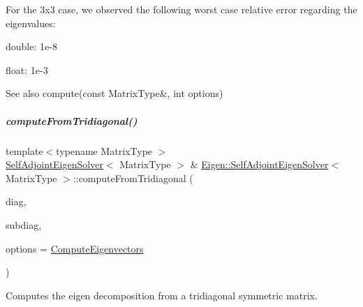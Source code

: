 For the 3x3 case, we observed the following worst case relative error regarding the eigenvalues\+:
\begin{DoxyItemize}
\item double\+: 1e-\/8
\item float\+: 1e-\/3
\end{DoxyItemize}

\begin{DoxySeeAlso}{See also}
compute(const Matrix\+Type\&, int options) 
\end{DoxySeeAlso}
\mbox{\label{group___eigenvalues___module_a297893df7098c43278d385e4d4e23fe4}} 
\subparagraph{\texorpdfstring{compute\+From\+Tridiagonal()}{computeFromTridiagonal()}\hspace{0.1cm}{\footnotesize\ttfamily [1/2]}}
{\footnotesize\ttfamily template$<$typename Matrix\+Type $>$ \\
\hyperlink{group___eigenvalues___module_class_eigen_1_1_self_adjoint_eigen_solver}{Self\+Adjoint\+Eigen\+Solver}$<$ Matrix\+Type $>$ \& \hyperlink{group___eigenvalues___module_class_eigen_1_1_self_adjoint_eigen_solver}{Eigen\+::\+Self\+Adjoint\+Eigen\+Solver}$<$ Matrix\+Type $>$\+::compute\+From\+Tridiagonal (\begin{DoxyParamCaption}\item[{const \hyperlink{group___eigenvalues___module_acd090d5fdfc3cc017a13b6d8daa92287}{Real\+Vector\+Type} \&}]{diag,  }\item[{const \hyperlink{group___core___module_class_eigen_1_1_matrix}{Sub\+Diagonal\+Type} \&}]{subdiag,  }\item[{int}]{options = {\ttfamily \hyperlink{group__enums_ggae3e239fb70022eb8747994cf5d68b4a9ada93d8885bde32b876ba4af01d3292cc}{Compute\+Eigenvectors}} }\end{DoxyParamCaption})}



Computes the eigen decomposition from a tridiagonal symmetric matrix. 



